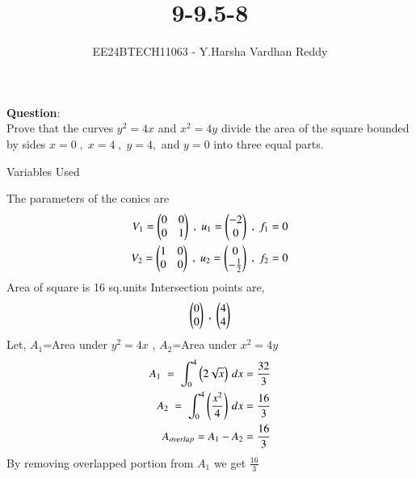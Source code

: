 \documentclass[journal]{IEEEtran}
\begin{document}

\vspace{3cm}

\title{9-9.5-8}
\author{EE24BTECH11063 - Y.Harsha Vardhan Reddy}
{\let\newpage\relax\maketitle}

\renewcommand{\thefigure}{\theenumi}
\renewcommand{\thetable}{\theenumi}
\setlength{\intextsep}{10pt} %


\renewcommand{\thetable}{\theenumi}
\textbf{Question}:\\
Prove that the curves $y^2=4x$ and $x^2=4y$ divide the area of the square bounded by sides $x=0\;,\;x=4\;,\;y=4,$ and $y=0$ into three equal parts.
\\
\solution
\begin{table}[h!]    
  \centering
  
  \caption{Variables Used}
  \label{tab1-1.2-20}
\end{table}
The parameters of the conics are
\begin{align}
V_1=\begin{pmatrix}0 & 0 \\ 0 & 1\end{pmatrix}\;,\;u_1=\begin{pmatrix}-2\\0\end{pmatrix} \;,\;f_1=0\\
V_2=\begin{pmatrix}1 & 0 \\ 0 & 0\end{pmatrix}\;,\;u_2=\begin{pmatrix}0\\-\frac{1}{2}\end{pmatrix}\;,\;f_2=0
\end{align}
Area of square is 16 sq.units
Intersection points are,
\begin{align}
\begin{pmatrix}0\\0\end{pmatrix}\;,\;\begin{pmatrix}4\\4\end{pmatrix}
\end{align}
Let, $A_1$=Area under $y^2=4x$ , $A_2$=Area under $x^2=4y$
\begin{align}
A_1\;=\;\int_{0}^{4} \left(2\sqrt{x}\right) \, dx = \frac{32}{3}\\
A_2\;=\;\int_{0}^{4} \left(\frac{x^2}{4}\right) \, dx = \frac{16}{3}\\
A_{overlap}=A_1-A_2=\frac{16}{3}
\end{align}
By removing overlapped portion from $A_1$ we get $\frac{16}{3}$\\
\end{document}
